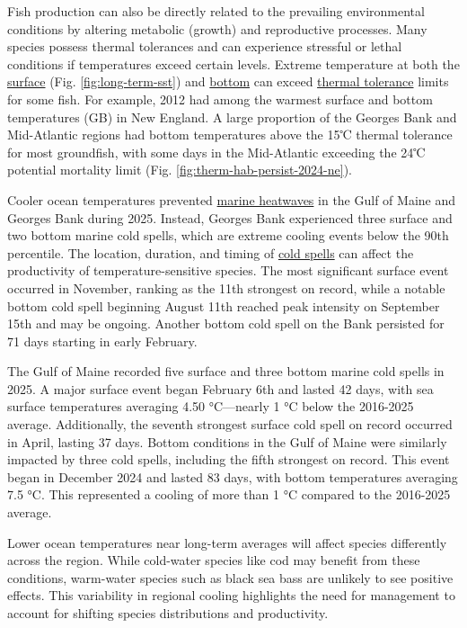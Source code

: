 \documentclass[
  10pt,
]{article}
\begin{document}
Fish production can also be directly related to the prevailing environmental conditions by altering metabolic (growth) and reproductive processes. Many species possess thermal tolerances and can experience stressful or lethal conditions if temperatures exceed certain levels. Extreme temperature at both the \href{https://noaa-edab.github.io/catalog/seasonal_oisst_anom.html}{surface} (Fig. \ref{fig:long-term-sst}) and \href{https://noaa-edab.github.io/catalog/bottom_temp_model_anom.html}{bottom} can exceed \href{https://noaa-edab.github.io/catalog/thermal_habitat_gridded.html}{thermal tolerance} limits for some fish. For example, 2012 had among the warmest surface and bottom temperatures (GB) in New England. A large proportion of the Georges Bank and Mid-Atlantic regions had bottom temperatures above the 15℃ thermal tolerance for most groundfish, with some days in the Mid-Atlantic exceeding the 24℃ potential mortality limit (Fig. \ref{fig:therm-hab-persist-2024-ne}).

Cooler ocean temperatures prevented \href{https://noaa-edab.github.io/catalog/heatwave.html}{marine heatwaves} in the Gulf of Maine and Georges Bank during 2025. Instead, Georges Bank experienced three surface and two bottom marine cold spells, which are extreme cooling events below the 90th percentile. The location, duration, and timing of \href{https://noaa-edab.github.io/catalog/cold_spell.html}{cold spells} can affect the productivity of temperature-sensitive species. The most significant surface event occurred in November, ranking as the 11th strongest on record, while a notable bottom cold spell beginning August 11th reached peak intensity on September 15th and may be ongoing. Another bottom cold spell on the Bank persisted for 71 days starting in early February.

The Gulf of Maine recorded five surface and three bottom marine cold spells in 2025. A major surface event began February 6th and lasted 42 days, with sea surface temperatures averaging 4.50 °C---nearly 1 °C below the 2016-2025 average. Additionally, the seventh strongest surface cold spell on record occurred in April, lasting 37 days. Bottom conditions in the Gulf of Maine were similarly impacted by three cold spells, including the fifth strongest on record. This event began in December 2024 and lasted 83 days, with bottom temperatures averaging 7.5 °C. This represented a cooling of more than 1 °C compared to the 2016-2025 average.

Lower ocean temperatures near long-term averages will affect species differently across the region. While cold-water species like cod may benefit from these conditions, warm-water species such as black sea bass are unlikely to see positive effects. This variability in regional cooling highlights the need for management to account for shifting species distributions and productivity.
\end{document}
